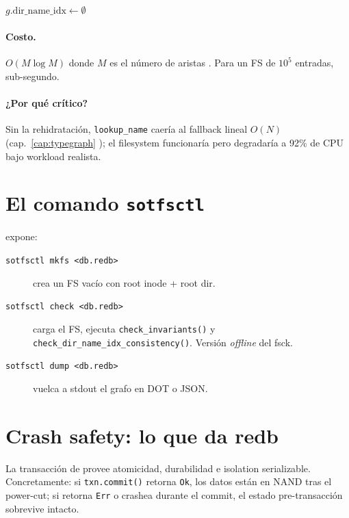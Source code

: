 \begin{algorithm}[H]
\SetAlgoLined
{}
\caption{\textsc{Graph.RebuildDirNameIdx}}\label{alg:rebuild-idx}

$g.\textrm{dir\_name\_idx} \gets \emptyset$\;
\end{algorithm}

\paragraph{Costo.} $O(M \log M)$ donde $M$ es el número de aristas
\econtains. Para un FS de \(10^5\) entradas, sub-segundo.

\paragraph{¿Por qué crítico?} Sin la rehidratación, \texttt{lookup\_name}
caería al fallback lineal $O(N)$
(cap.~\ref{cap:typegraph} ); el filesystem
funcionaría pero degradaría a 92\% de CPU bajo workload realista.

\section{El comando \texttt{sotfsctl}}

 expone:

\begin{description}
  \item[\texttt{sotfsctl mkfs <db.redb>}] crea un FS vacío con root inode
    + root dir.
  \item[\texttt{sotfsctl check <db.redb>}] carga el FS, ejecuta
    \texttt{check\_invariants()} y \texttt{check\_dir\_name\_idx\_consistency()}.
    Versión \emph{offline} del fsck.
  \item[\texttt{sotfsctl dump <db.redb>}] vuelca a stdout el grafo en
    DOT o JSON.
\end{description}

\section{Crash safety: lo que da redb}

\begin{teorema}
\label{teo:redb-garantias}
La transacción de \redb{} provee atomicidad, durabilidad e isolation
serializable. Concretamente: si \texttt{txn.commit()} retorna
\texttt{Ok}, los datos están en NAND tras el power-cut; si retorna
\texttt{Err} o crashea durante el commit, el estado pre-transacción
sobrevive intacto.
\end{teorema}

